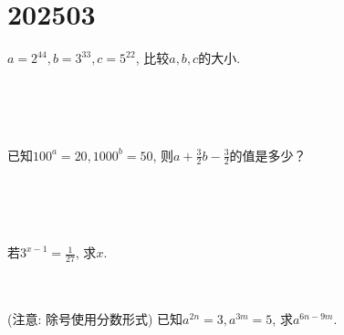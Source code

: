 \section{202503}

\item{
    $a=2^{44}, b=3^{33}, c=5^{22}$, 比较$a, b, c$的大小.
    \iffalse
    \fangsong\zihao{4}
    思路: 把指数化为一样,比较底数大小.

    解答: 
    \begin{align*}
        a &= (2^4)^{11} = 16^{11}\\
        b &= (3^3)^{11} = 27^{11}\\
        c &= (5^2)^{11} = 25^{11}\\
        & 16^{11} < 25^{11} < 27^{11}\\
        &\therefore a < c < b.
    \end{align*}
    \fi
}
\\ \\ \\
\item{
    已知$100^a=20, 1000^b=50$, 则$a+\frac{3}{2}b-\frac{3}{2}$的值是多少？
     \iffalse
     \fangsong\zihao{4}
     思路: 观察$100^a, 1000^b$ 发现 $a,b$都出现在指数上, 要求$a+\frac{3}{2}b-\frac{3}{2}$的值, 应该想到尝试把$a+\frac{3}{2}b-\frac{3}{2}$放在指数上.
 
     解答: 
     \begin{align*}
         100^{a+\frac{3}{2}b-\frac{3}{2}} &= \frac{100^a\cdot 100^{\frac{3}{2}b}}{100^\frac{3}{2}}\\
         &= \frac{100^a\cdot 10^{2\cdot \frac{3}{2}b}}{10^{2\cdot\frac{3}{2}}}\\
         &= \frac{100^a\cdot 10^{3b}} {10^{3}}\\
         &= \frac{100^a\cdot 1000^{b}} {1000}\\
         &= \frac{20\times 50} {1000}\\
         &= 1\\
         &\therefore a+\frac{3}{2}b-\frac{3}{2} = 0.
     \end{align*}
     \fi
}
\\ \\ \\
\item{
    若$3^{x-1}=\frac{1}{27}$, 求$x$.
}
\\ \\ \\
\item{
    (注意: 除号使用分数形式) 已知$a^{2n}=3, a^{3m}=5$, 求$a^{6n-9m}$.
    \iffalse
    \fangsong\zihao{4}
    思路: 将$a^{6n-9m}$凑出$a^{2n}, a^{3m}$, 直接代入计算. 结果使用分数形式即可.

    解答: 
    \begin{align*}
        a^{6n-9m} &= \frac{a^{6n}}{a^{9m}}\\
        &= \frac{(a^{2n})^3} {(a^{3m})^3}\\
        &= \frac{3^3} {5^3}\\
        &= \frac{27} {125}.
    \end{align*}
    \fi
}
